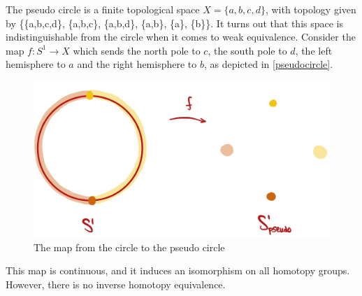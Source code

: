 \documentclass{article}[11pt]
\begin{document}
\begin{example}
The pseudo circle is a finite topological space $X=\{a,b,c,d\}$, with topology given by \{\{a,b,c,d\}, \{a,b,c\}, \{a,b,d\}, \{a,b\}, \{a\}, \{b\}\}. It turns out that this space is indistinguishable from the circle when it comes to weak equivalence. Consider the  map $f\colon S^1\to X$ which sends the north pole to $c$, the south pole to $d$, the left hemisphere to $a$ and the right hemisphere to $b$, as depicted in \autoref{pseudocircle}.

\begin{figure}[h]
  \includegraphics[scale=.18]{pics/pseudocircle.png}
  \centering
  \caption{The map from the circle to the pseudo circle}
  \label{pseudocircle}
\end{figure}

This map is continuous, and it induces an isomorphism on all homotopy groups. However, there is no inverse homotopy equivalence.
\end{example}
\end{document}
